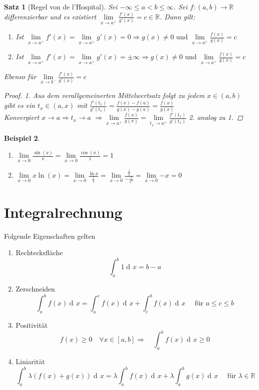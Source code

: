 \documentclass[a4paper,titlepage,oneside]{article}
\def\R{\ensuremath{\mathbb{R}} }
\newcommand{\der}{\operatorname{d\!}{}}
\def\fa{\ensuremath{\forall}}
\newcommand{\limnull}[2][n]{\ensuremath{\lim\limits_{#1 \rightarrow 0}{#2}}}
\newcommand{\limpos}[3][n]{\ensuremath{\lim\limits_{#1 \rightarrow #2^+}{#3}}}
\newcommand{\limneg}[3][n]{\ensuremath{\lim\limits_{#1 \rightarrow #2^-}{#3}}}
\newcommand{\integral}[4][x]{\ensuremath{\int_{#2}^{#3}{#4\der #1}}}
\newcommand{\intAB}[2][x]{\integral[#1]{a}{b}{#2}}
\theoremstyle{thmstyle}
\newtheorem{satz}{Satz}[section]
\newtheorem{bsp}[satz]{Beispiel}
\theoremstyle{subthmstyle}
\begin{document}
\begin{satz}[Regel von de l'Hospital]
Sei $-\infty \le a < b \le \infty$. Sei $f : (a,b) \to \R $ differenzierbar und es existiert $\limpos[x]{a}{\frac{f'(x)}{g'(x)}} = c \in \R$.
Dann gilt:
\begin{enumerate}
\item Ist $\limpos[x]{a}{f'(x)} = \limpos[x]{a}{g'(x)} = 0 \Rightarrow g(x) \ne 0 \text{ und } \limpos[x]{a}{\frac{f(x)}{g(x)}} = c$
\item Ist $\limpos[x]{a}{f'(x)} = \limpos[x]{a}{g'(x)} = \pm \infty \Rightarrow g(x) \ne 0 \text{ und } \limpos[x]{a}{\frac{f(x)}{g(x)}} = c$
\end{enumerate}
Ebenso für $\limneg[x]{b}{\frac{f'(x)}{g'(x)}} = c$
\begin{proof}
1. Aus dem verallgemeinerten Mittelwertsatz folgt zu jedem $x \in (a,b)$ gibt es ein $t_x \in (a,x)$ mit $\frac{f'(t_x)}{g'(t_x)} = \frac{f(x) - f(a)}{g(x) - g(a)} = \frac{f(x)}{g(x)}$\\
Konvergiert $x \to a \Rightarrow  t_x \to a$
$\Rightarrow \limpos[x]{a}{\frac{f(x)}{g(x)}} = \limpos[t_x]{a}{\frac{f'(t_x)}{g'(t_x)}}$
2. analog zu 1.
\end{proof}
\end{satz}

\begin{bsp}
\begin{enumerate}
\item $ \limnull[x]{\frac{\sin(x)}{x}} = \limnull[x]{\frac{\cos(x)}{1}} = 1$
\item $ \limnull[x]{x \ln(x)} = \limnull[x]{\frac{\ln x}{\frac{1}{x}}} = \limnull[x]{\frac{\frac{1}{x}}{-\frac{1}{x^2}}} = \limnull[x]{-x} = 0$
\end{enumerate}
\end{bsp}

\newpage
\section{Integralrechnung}

Folgende Eigenschaften gelten
\begin{enumerate}
\item Rechtecksfläche \[  \intAB{1} = b - a\]
\item Zerschneiden \[  \intAB{f(x)} = \integral{a}{c}{f(x)} + \integral{c}{b}{f(x)} \quad \text{ für } a \le c \le b \]
\item Positivität \[ f(x) \ge 0 \quad \fa x \in [a,b] \Rightarrow \quad \intAB{f(x)} \ge 0\]
\item Liniarität \[\intAB{\lambda (f(x) + g(x))} = \lambda \intAB{f(x)} + \lambda \intAB{g(x)} \quad \text{ für } \lambda \in \R\]
\end{enumerate}
\end{document}
